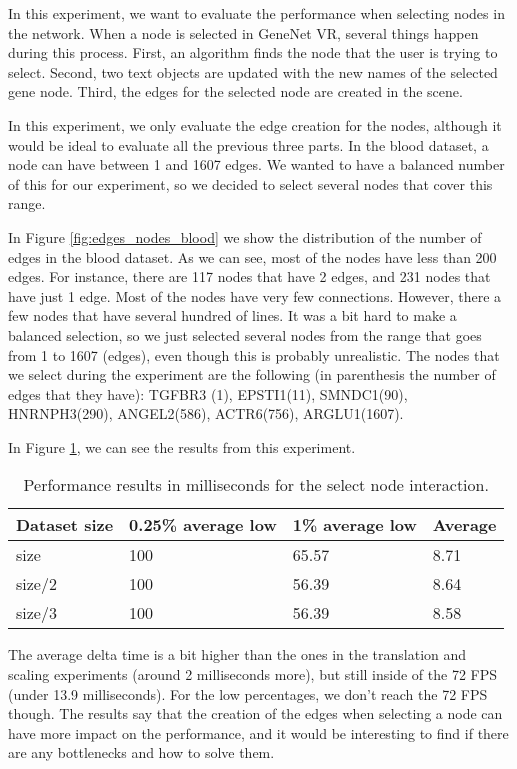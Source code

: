 In this experiment, we want to evaluate the performance when selecting nodes in the network. When a node is selected in GeneNet VR, several things happen during this process. First, an algorithm finds the node that the user is trying to select. Second, two text objects are updated with the new names of the selected gene node. Third, the edges for the selected node are created in the scene.

In this experiment, we only evaluate the edge creation for the nodes, although it would be ideal to evaluate all the previous three parts. In the blood dataset, a node can have between 1 and 1607 edges. We wanted to have a balanced number of this for our experiment, so we decided to select several nodes that cover this range.

In Figure \ref{fig:edges_nodes_blood} we show the distribution of the number of edges in the blood dataset. As we can see, most of the nodes have less than 200 edges. For instance, there are 117 nodes that have 2 edges, and 231 nodes that have just 1 edge. Most of the nodes have very few connections. However, there a few nodes that have several hundred of lines. It was a bit hard to make a balanced selection, so we just selected several nodes from the range that goes from 1 to 1607 (edges), even though this is probably unrealistic. The nodes that we select during the experiment are the following (in parenthesis the number of edges that they have): TGFBR3 (1), EPSTI1(11), SMNDC1(90), HNRNPH3(290), ANGEL2(586), ACTR6(756), ARGLU1(1607).

In Figure \ref{tab:experiment_select}, we can see the results from this experiment.

\begin{table}[h!]
\centering
\begin{tabular}{llll}
  \hline
Dataset size & 0.25\% average low & 1\% average low & Average \\
\hline
size & 100 & 65.57 & 8.71 \\
size/2 & 100 & 56.39 & 8.64 \\
size/3 & 100 & 56.39 & 8.58 \\
\end{tabular}
\caption{Performance results in milliseconds for the select node interaction.}
\label{tab:experiment_select}
\end{table}

The average delta time is a bit higher than the ones in the translation and scaling experiments (around 2 milliseconds more), but still inside of the 72 FPS (under 13.9 milliseconds). For the low percentages, we don't reach the 72 FPS though. The results say that the creation of the edges when selecting a node can have more impact on the performance, and it would be interesting to find if there are any bottlenecks and how to solve them.

